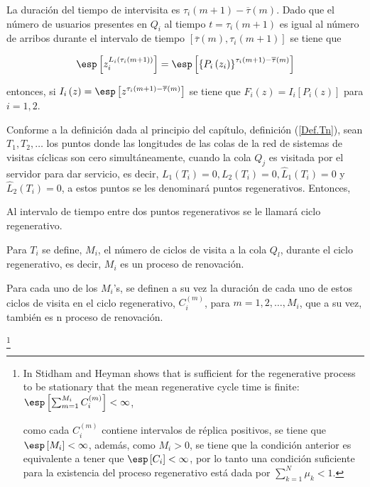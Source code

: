 La duraci\'on del tiempo de intervisita es $\tau_{i}\left(m+1\right)-\overline{\tau}\left(m\right)$. Dado que el n\'umero de usuarios presentes en $Q_{i}$ al tiempo $t=\tau_{i}\left(m+1\right)$ es igual al n\'umero de arribos durante el intervalo de tiempo $\left[\overline{\tau}\left(m\right),\tau_{i}\left(m+1\right)\right]$ se tiene que


\begin{eqnarray*}
\esp\left[z_{i}^{L_{i}\left(\tau_{i}\left(m+1\right)\right)}\right]=\esp\left[\left\{P_{i}\left(z_{i}\right)\right\}^{\tau_{i}\left(m+1\right)-\overline{\tau}\left(m\right)}\right]
\end{eqnarray*}

entonces, si $I_{i}\left(z\right)=\esp\left[z^{\tau_{i}\left(m+1\right)-\overline{\tau}\left(m\right)}\right]$
se tiene que $F_{i}\left(z\right)=I_{i}\left[P_{i}\left(z\right)\right]$
para $i=1,2$.

Conforme a la definici\'on dada al principio del cap\'itulo, definici\'on (\ref{Def.Tn}), sean $T_{1},T_{2},\ldots$ los puntos donde las longitudes de las colas de la red de sistemas de visitas c\'iclicas son cero simult\'aneamente, cuando la cola $Q_{j}$ es visitada por el servidor para dar servicio, es decir, $L_{1}\left(T_{i}\right)=0,L_{2}\left(T_{i}\right)=0,\hat{L}_{1}\left(T_{i}\right)=0$ y $\hat{L}_{2}\left(T_{i}\right)=0$, a estos puntos se les denominar\'a puntos regenerativos. Entonces, 

\begin{Def}
Al intervalo de tiempo entre dos puntos regenerativos se le llamar\'a ciclo regenerativo.
\end{Def}

\begin{Def}
Para $T_{i}$ se define, $M_{i}$, el n\'umero de ciclos de visita a la cola $Q_{l}$, durante el ciclo regenerativo, es decir, $M_{i}$ es un proceso de renovaci\'on.
\end{Def}

\begin{Def}
Para cada uno de los $M_{i}$'s, se definen a su vez la duraci\'on de cada uno de estos ciclos de visita en el ciclo regenerativo, $C_{i}^{(m)}$, para $m=1,2,\ldots,M_{i}$, que a su vez, tambi\'en es n proceso de renovaci\'on.
\end{Def}

\footnote{In Stidham and  Heyman \cite{Stidham} shows that is sufficient for the regenerative process to be stationary that the mean regenerative cycle time is finite: $\esp\left[\sum_{m=1}^{M_{i}}C_{i}^{(m)}\right]<\infty$, 


 como cada $C_{i}^{(m)}$ contiene intervalos de r\'eplica positivos, se tiene que $\esp\left[M_{i}\right]<\infty$, adem\'as, como $M_{i}>0$, se tiene que la condici\'on anterior es equivalente a tener que $\esp\left[C_{i}\right]<\infty$,
por lo tanto una condici\'on suficiente para la existencia del proceso regenerativo est\'a dada por $\sum_{k=1}^{N}\mu_{k}<1.$}

